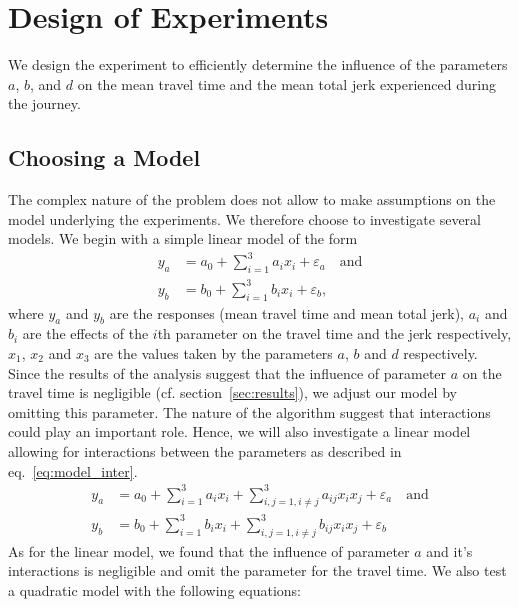 \section{Design of Experiments}

We design the experiment to efficiently determine the influence of the  parameters $a$, $b$, and $d$ on the mean travel time and the mean total jerk experienced during the journey.

\subsection{Choosing a Model}
The complex nature of the problem does not allow to make assumptions on the model underlying the experiments. We therefore choose to investigate several models. We begin with a simple linear model of the form
\begin{subequations}\label{eq:model_lin}
\begin{align}
	y_a &= a_0 + \displaystyle\sum_{i=1}^{3} a_i x_i + \varepsilon_a \quad \text{and}\\ 
	y_b &= b_0 + \displaystyle\sum_{i=1}^{3} b_i x_i + \varepsilon_b,
\end{align}
\end{subequations}
where $y_a$ and $y_b$ are the responses (mean travel time and mean total jerk), $a_i$ and $b_i$ are the effects of the $i$th parameter on the travel time and the jerk respectively, $x_1$, $x_2$ and $x_3$ are the values taken by the parameters $a$, $b$ and $d$ respectively. Since the results of the analysis suggest that the influence of parameter $a$ on the travel time is negligible (cf. section~\ref{sec:results}), we adjust our model by omitting this parameter.
The nature of the algorithm suggest that interactions could play an important role. Hence, we will also investigate a linear model allowing for interactions between the parameters as described in eq.~\ref{eq:model_inter}.
\begin{subequations}\label{eq:model_inter}
\begin{align}
	y_a &= a_0 + \displaystyle\sum_{i=1}^{3} a_i x_i + \displaystyle\sum_{i,j=1, i \neq j}^{3} a_{ij} x_i x_j + \varepsilon_a \quad \text{and}\\ 
	y_b &= b_0 + \displaystyle\sum_{i=1}^{3} b_i x_i + \displaystyle\sum_{i,j=1, i \neq j}^{3} b_{ij} x_i x_j + \varepsilon_b
\end{align}
\end{subequations}
As for the linear model, we found that the influence of parameter $a$ and it's interactions is negligible and omit the parameter for the travel time. We also test a quadratic model with the following equations:
